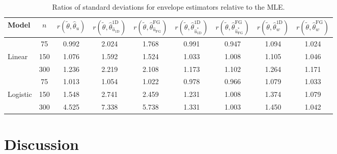 \documentclass{article}\usepackage[]{graphicx}\usepackage[]{color}
\begin{document}
\begin{table}
\caption{\footnotesize Ratios of standard deviations for envelope estimators relative to the MLE.}
\small
\begin{center}
\begin{tabular}{lc|ccccccc} 
  Model  & $n$ & $r(\tilde{\theta},\hat{\theta}_u)$ &
  $r(\tilde{\theta},\hat{\theta}^{\text{1D}}_{\hat{u}_{\text{1D}}})$ &
  $r(\tilde{\theta},\hat{\theta}^{\text{FG}}_{\hat{u}_{\text{FG}}})$ &  
  $r(\tilde{\theta},\hat{\theta}^{\text{1D}}_{\hat{u}^{*}_{\text{1D}}})$ & 
  $r(\tilde{\theta},\hat{\theta}^{\text{FG}}_{\hat{u}^{*}_{\text{FG}}})$ &   
  $r(\tilde{\theta},\hat{\theta}^{\text{1D}}_w)$ & 
  $r(\tilde{\theta},\hat{\theta}^{\text{FG}}_w)$ \\  
  \hline
  		 & 75  & 0.992 & 2.024 & 1.768 & 0.991 & 0.947 & 1.094 & 1.024 \\
  Linear & 150 & 1.076 & 1.592 & 1.524 & 1.033 & 1.008 & 1.105 & 1.046 \\
  		 & 300 & 1.236 & 2.219 & 2.108 & 1.173 & 1.102 & 1.264 & 1.171 \\
  		 \hline
  		   &  75 & 1.013 & 1.054 & 1.022 & 0.978 & 0.966 & 1.079 & 1.033 \\
  Logistic & 150 & 1.548 & 2.741 & 2.459 & 1.231 & 1.008 & 1.374 & 1.079 \\
           & 300 & 4.525 & 7.338 & 5.738 & 1.331 & 1.003 & 1.450 & 1.042 \\
  		  \hline
\end{tabular}
\end{center}
\label{tab:bootstrap}
\end{table}


\section{Discussion}

\end{document}
